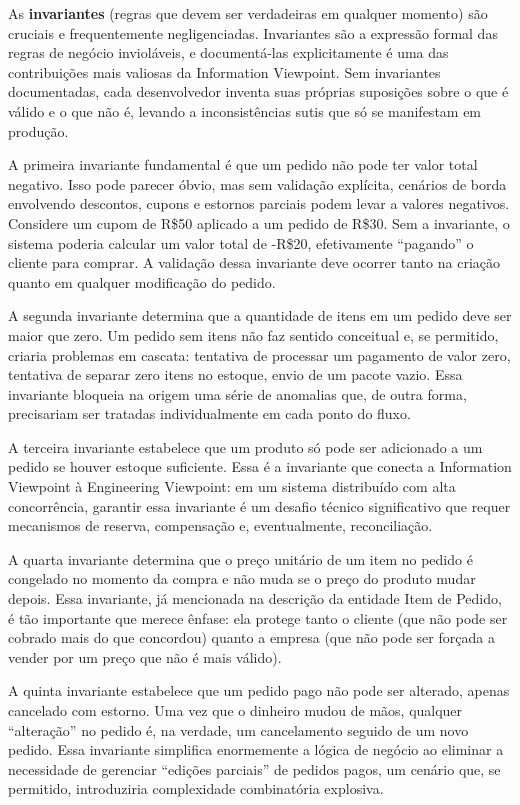 As \textbf{invariantes} (regras que devem ser verdadeiras em qualquer momento)
são cruciais e frequentemente negligenciadas. Invariantes são a expressão
formal das regras de negócio invioláveis, e documentá-las explicitamente é uma
das contribuições mais valiosas da Information Viewpoint. Sem invariantes
documentadas, cada desenvolvedor inventa suas próprias suposições sobre o que é
válido e o que não é, levando a inconsistências sutis que só se manifestam em
produção.

A primeira invariante fundamental é que um pedido não pode ter valor total
negativo. Isso pode parecer óbvio, mas sem validação explícita, cenários de borda
envolvendo descontos, cupons e estornos parciais podem levar a valores negativos.
Considere um cupom de R\$50 aplicado a um pedido de R\$30. Sem a invariante, o
sistema poderia calcular um valor total de -R\$20, efetivamente ``pagando'' o
cliente para comprar. A validação dessa invariante deve ocorrer tanto na criação
quanto em qualquer modificação do pedido.

A segunda invariante determina que a quantidade de itens em um pedido deve ser
maior que zero. Um pedido sem itens não faz sentido conceitual e, se permitido,
criaria problemas em cascata: tentativa de processar um pagamento de valor zero,
tentativa de separar zero itens no estoque, envio de um pacote vazio. Essa
invariante bloqueia na origem uma série de anomalias que, de outra forma,
precisariam ser tratadas individualmente em cada ponto do fluxo.

A terceira invariante estabelece que um produto só pode ser adicionado a um pedido
se houver estoque suficiente. Essa é a invariante que conecta a Information
Viewpoint à Engineering Viewpoint: em um sistema distribuído com alta concorrência,
garantir essa invariante é um desafio técnico significativo que requer mecanismos
de reserva, compensação e, eventualmente, reconciliação.

A quarta invariante determina que o preço unitário de um item no pedido é congelado
no momento da compra e não muda se o preço do produto mudar depois. Essa invariante,
já mencionada na descrição da entidade Item de Pedido, é tão importante que merece
ênfase: ela protege tanto o cliente (que não pode ser cobrado mais do que concordou)
quanto a empresa (que não pode ser forçada a vender por um preço que não é mais
válido).

A quinta invariante estabelece que um pedido pago não pode ser alterado, apenas
cancelado com estorno. Uma vez que o dinheiro mudou de mãos, qualquer ``alteração''
no pedido é, na verdade, um cancelamento seguido de um novo pedido. Essa
invariante simplifica enormemente a lógica de negócio ao eliminar a necessidade
de gerenciar ``edições parciais'' de pedidos pagos, um cenário que, se
permitido, introduziria complexidade combinatória explosiva.

